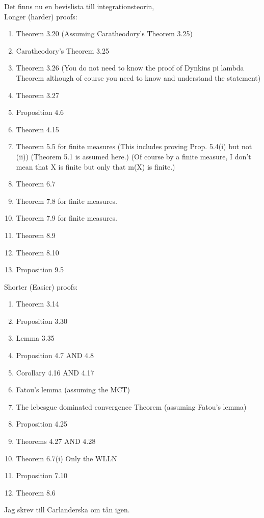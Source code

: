 Det finns nu en bevislista till integrationsteorin,\\
Longer (harder) proofs:
\begin{enumerate}
	\item Theorem 3.20 (Assuming Caratheodory's Theorem 3.25)
	\item Caratheodory's Theorem 3.25
	\item Theorem 3.26 (You do not need to know the proof of Dynkins pi lambda Theorem  although of course you need to know and understand the statement)
	\item Theorem 3.27
	\item Proposition 4.6 
	\item Theorem 4.15
	\item Theorem 5.5 for finite measures (This includes proving Prop. 5.4(i) but not (ii))  (Theorem 5.1 is assumed here.) (Of course by a finite measure, I don't mean that X is finite but only that m(X) is finite.)
	\item Theorem 6.7
	\item Theorem 7.8 for finite measures.
	\item  Theorem 7.9 for finite measures.
	\item  Theorem 8.9
	\item  Theorem 8.10
	\item  Proposition 9.5
\end{enumerate} 
Shorter (Easier) proofs:
\begin{enumerate}
	\item Theorem 3.14
	\item Proposition 3.30
	\item Lemma 3.35
	\item Proposition 4.7 AND 4.8
	\item Corollary 4.16 AND 4.17
	\item Fatou's lemma (assuming the MCT)
	\item The lebesgue dominated convergence Theorem  (assuming Fatou's lemma)
	\item Proposition 4.25
	\item Theorems 4.27 AND 4.28
	\item  Theorem 6.7(i) Only the WLLN
	\item  Proposition 7.10
	\item  Theorem 8.6
\end{enumerate}

\bigskip

Jag skrev till Carlanderska om tån igen.


